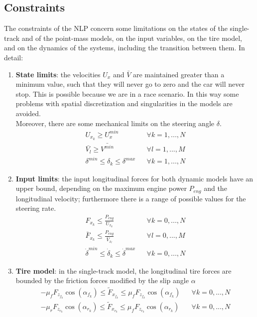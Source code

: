 \documentclass[a4paper, onecolumn, 11pt]{article}
\begin{document}
\subsection{Constraints}
The constraints of the NLP concern some limitations on the states of the single-track and of the point-mass models, 
on the input variables, on the tire model, and on the dynamics of the systems, including the transition between
them. In detail:
\begin{enumerate}
    \item \textbf{State limits}: the velocities $U_x$ and $\bar{V}$ are maintained greater than a minimum value, such 
    that they will never go to zero and the car will never stop. This is possible because we are in a race scenario.
    In this way some problems with spatial discretization and singularities in the models are avoided.\\
    Moreover, there are some mechanical limits on the steering angle $\delta$.
    \begin{align}
        U_{x_k} \geq U_x^{min} && \forall k=1,...,N\\
        \bar{V_l} \geq \bar{V^{min}} && \forall l=1,...,M\\
        \delta^{min} \leq \delta_k \leq \delta^{max} && \forall k=1,...,N
    \end{align}

    \item \textbf{Input limits}: the input longitudinal forces for both dynamic models have an upper bound, depending
    on the maximum engine power $P_{eng}$ and the longitudinal velocity; furthermore there is a range of possible values
    for the steering rate.
    \begin{align}
        F_{x_k} \leq \frac{P_{eng}}{U_{x_k}} && \forall k=0,...,N \\
        \bar{F}_{x_k} \leq \frac{P_{eng}}{\bar{V}_{x_l}} && \forall l=0,...,M \\
        \dot{\delta}^{min} \leq \dot{\delta}_{k} \leq \dot{\delta}^{max} && \forall k=0,...,N
    \end{align}

    \item \textbf{Tire model}: in the single-track model, the longitudinal tire forces are bounded by the friction forces 
    modified by the slip angle $\alpha$
    \begin{align}
        -\mu_f F_{z_{f_k}} \cos(\alpha_{f_k}) \leq \tilde{F}_{x_{f_k}} \leq \mu_f F_{z_{f_k}} \cos(\alpha_{f_k}) && \forall k=0,...,N \\
        -\mu_r F_{z_{r_k}} \cos(\alpha_{r_k}) \leq \tilde{F}_{x_{r_k}} \leq \mu_f F_{z_{r_k}} \cos(\alpha_{r_k}) && \forall k=0,...,N 
    \end{align}


\end{enumerate}
\end{document}
